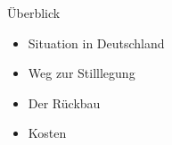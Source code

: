 


\frame{\maketitle}



\begin{frame}{ Überblick }
  \begin{itemize}
    \setlength\itemsep{1.2em}
      \item{ Situation in Deutschland }
      \item{ Weg zur Stilllegung }
      \item{ Der Rückbau }
      \item{ Kosten }
  \end{itemize}
\end{frame}






